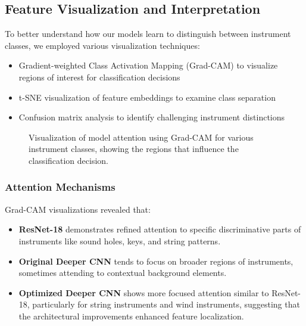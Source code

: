 \subsection{Feature Visualization and Interpretation}
To better understand how our models learn to distinguish between instrument classes, we employed various visualization techniques:
\begin{itemize}
    \item Gradient-weighted Class Activation Mapping (Grad-CAM) to visualize regions of interest for classification decisions
    \item t-SNE visualization of feature embeddings to examine class separation
    \item Confusion matrix analysis to identify challenging instrument distinctions
\end{itemize}

\begin{figure}[ht]
    \centering
    \caption{Visualization of model attention using Grad-CAM for various instrument classes, showing the regions that influence the classification decision.}
    \label{fig:gradcam}
\end{figure}

\subsubsection{Attention Mechanisms}
Grad-CAM visualizations revealed that:
\begin{itemize}
    \item \textbf{ResNet-18} demonstrates refined attention to specific discriminative parts of instruments like sound holes, keys, and string patterns.
    
    \item \textbf{Original Deeper CNN} tends to focus on broader regions of instruments, sometimes attending to contextual background elements.
    
    \item \textbf{Optimized Deeper CNN} shows more focused attention similar to ResNet-18, particularly for string instruments and wind instruments, suggesting that the architectural improvements enhanced feature localization.
\end{itemize}

